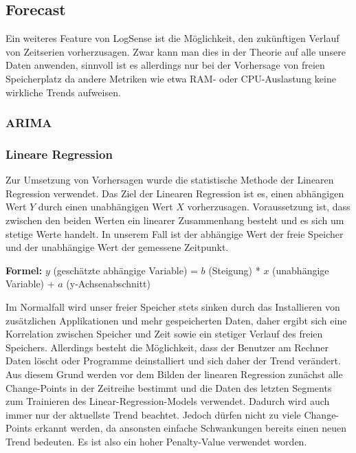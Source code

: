 \documentclass{report}
\begin{document}
\subsection{Forecast}
Ein weiteres Feature von LogSense ist die Möglichkeit, den zukünftigen Verlauf von Zeitserien vorherzusagen. Zwar kann man dies in der Theorie auf alle unsere Daten anwenden, sinnvoll ist es allerdings nur bei der Vorhersage von freien Speicherplatz da andere Metriken wie etwa RAM- oder CPU-Auslastung keine wirkliche Trends aufweisen. 
\subsubsection{ARIMA}
\subsubsection{Lineare Regression}

Zur Umsetzung von Vorhersagen wurde die statistische Methode der Linearen Regression verwendet. Das Ziel der Linearen Regression ist es, einen abhängigen Wert \( Y \) durch einen unabhängigen Wert \( X \) vorherzusagen. Voraussetzung ist, dass zwischen den beiden Werten ein linearer Zusammenhang besteht und es sich um stetige Werte handelt. In unserem Fall ist der abhängige Wert der freie Speicher und der unabhängige Wert der gemessene Zeitpunkt.\newline

 
\textbf{Formel:} \( y \) (geschätzte abhängige Variable) = \( b \) (Steigung) * \( x \) (unabhängige Variable) + \( a \) (y-Achsenabschnitt)\newline


Im Normalfall wird unser freier Speicher stets sinken durch das Installieren von zusätzlichen Applikationen und mehr gespeicherten Daten, daher ergibt sich eine Korrelation zwischen Speicher und Zeit sowie ein stetiger Verlauf des freien Speichers. Allerdings besteht die Möglichkeit, dass der Benutzer am Rechner Daten löscht oder Programme deinstalliert und sich daher der Trend verändert.
Aus diesem Grund werden vor dem Bilden der linearen Regression zunächst alle Change-Points in der Zeitreihe bestimmt und die Daten des letzten Segments zum Trainieren des Linear-Regression-Models verwendet. Dadurch wird auch immer nur der aktuellste Trend beachtet. Jedoch dürfen nicht zu viele Change-Points erkannt werden, da ansonsten einfache Schwankungen bereits einen neuen Trend bedeuten. Es ist also ein hoher Penalty-Value verwendet worden.\newline
\end{document}
